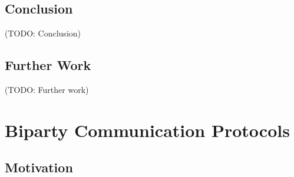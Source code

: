 \documentclass[a4paper,twoside]{article}
\newcommand{\TODO}[1]{\textcolor{YellowOrange}{(TODO: #1)}} %
\begin{document}
\subsection{Conclusion}

\TODO{Conclusion}

\subsection{Further Work}

\TODO{Further work}

%
%
%
%
%
%

\clearpage
\section{Biparty Communication Protocols}
\label{biparty}

\subsection{Motivation}
\end{document}
